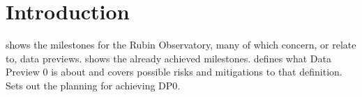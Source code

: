\section{Introduction}
 shows the milestones for the Rubin Observatory, many of which
concern, or relate to, data previews.
 shows the already achieved milestones.
 defines what Data Preview 0 is about and covers possible risks and mitigations to that
definition.
 Sets out the planning for achieving DP0.


